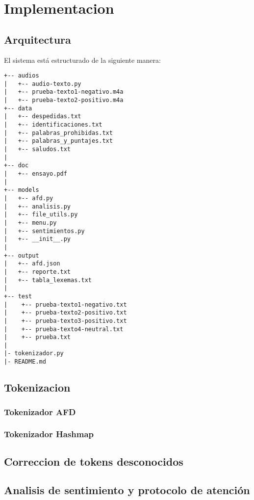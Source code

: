 \section{Implementacion}

\subsection{Arquitectura}
El sistema está estructurado de la siguiente manera:

\begin{tcolorbox}[colback=gray!10, colframe=gray!80, sharp corners, boxrule=0.5pt]
\begin{verbatim}
+-- audios
|   +-- audio-texto.py
|   +-- prueba-texto1-negativo.m4a
|   +-- prueba-texto2-positivo.m4a
+-- data
|   +-- despedidas.txt
|   +-- identificaciones.txt
|   +-- palabras_prohibidas.txt
|   +-- palabras_y_puntajes.txt
|   +-- saludos.txt
|
+-- doc
|   +-- ensayo.pdf
|
+-- models
|   +-- afd.py
|   +-- analisis.py
|   +-- file_utils.py
|   +-- menu.py
|   +-- sentimientos.py
|   +-- __init__.py
|
+-- output
|   +-- afd.json
|   +-- reporte.txt
|   +-- tabla_lexemas.txt
|
+-- test
|    +-- prueba-texto1-negativo.txt
|    +-- prueba-texto2-positivo.txt
|    +-- prueba-texto3-positivo.txt
|    +-- prueba-texto4-neutral.txt
|    +-- prueba.txt
|
|- tokenizador.py
|- README.md

\end{verbatim}
\end{tcolorbox}

\subsection{Tokenizacion}
\subsubsection{Tokenizador AFD}
\subsubsection{Tokenizador Hashmap}

\subsection{Correccion de tokens desconocidos}

\subsection{Analisis de sentimiento y protocolo de atención}

